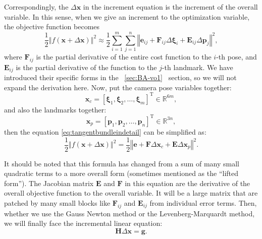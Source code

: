Correspondingly, the $\Delta \mathbf{x}$ in the increment equation is the increment of the overall variable. In this sense, when we give an increment to the optimization variable, the objective function becomes
\begin{equation}
	\label{eq:tangentbundleindetail}
	\frac{1}{2}\left\Vert f(\mathbf{x} + \Delta \mathbf{x}) \right\Vert ^2 \approx \frac{1}{2}\sum_{i=1}^{m}\sum_{j=1}^n \left\Vert \mathbf{e}_{ij} + \mathbf{F}_{ij} \Delta \mathbf{\xi}_{i} + \mathbf{E}_{ij} \Delta \mathbf{p}_j \right\Vert^2,
\end{equation}
where $\mathbf{F}_{ij}$ is the partial derivative of the entire cost function to the $i$-th pose, and $\mathbf{E}_{ij}$ is the partial derivative of the function to the $j$-th landmark. We have introduced their specific forms in the ~\ref{sec:BA-vo1}~ section, so we will not expand the derivation here. Now, put the camera pose variables together:
\begin{equation}
	\mathbf{x}_c=[ \mathbf{\xi}_1, \mathbf{\xi}_2, \ldots, \mathbf{\xi}_m ]^\mathrm{T} \in \mathbb{R}^{6m},
\end{equation}
and also the landmarks together: 
\begin{equation}
	\mathbf{x}_p=[ \mathbf{p}_1, \mathbf{p}_2, \ldots , \mathbf{p}_n ]^\mathrm{T}\in \mathbb{R}^{3n},
\end{equation}
then the equation \eqref{eq:tangentbundleindetail} can be simplified as: 
\begin{equation}
	\label{eq:BAleastsquare}
	\frac{1}{2}
	\left\Vert 
	f(\mathbf{x}+ \Delta \mathbf{x} )
	\right\Vert ^2 = 
	\frac{1}{2} 
	\left\Vert 
	\mathbf{e} + \mathbf{F}\Delta \mathbf{x}_c + \mathbf{E} \Delta \mathbf{x}_p 
	\right \Vert ^2 .
\end{equation}

It should be noted that this formula has changed from a sum of many small quadratic terms to a more overall form (sometimes mentioned as the ``lifted form''). The Jacobian matrix $\mathbf{E}$ and $\mathbf{F}$ in this equation are the derivative of the overall objective function to the overall variable. It will be a large matrix that are patched by many small blocks like $\mathbf{F}_{ij}$ and $\mathbf{E}_{ij}$ from individual error terms. Then, whether we use the Gauss Newton method or the Levenberg-Marquardt method, we will finally face the incremental linear equation:
\begin{equation}
	\mathbf{H} \Delta \mathbf{x} = \mathbf{g}.
\end{equation}

